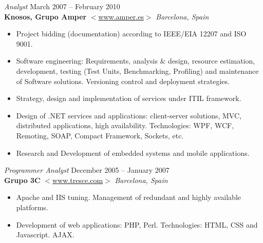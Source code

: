 \documentclass[line,margin]{res}
\begin{document}
\begin{resume}
                {\sl Analyst} \hfill            March 2007 -- February 2010 \\
                \textbf{Knosos, Grupo Amper} 
                $<$\url{www.amper.es}$>$ \hfill \textit{Barcelona, Spain}
                \begin{itemize}  \itemsep 2pt %
                \item Project bidding (documentation) according to IEEE/EIA 12207
                and ISO 9001.               
                \item Software engineering: Requirements, analysis \& design, 
                resource estimation, development, testing (Test Units, Benchmarking,
                Profiling) and maintenance of Software solutions. Versioning control
                and deployment strategies.               
                \item Strategy, design and implementation of services under ITIL 
                framework.               
                \item Design of .NET services and applications: client-server
                solutions, MVC, distributed applications, high availability.
                Technologies: WPF, WCF, Remoting, SOAP, Compact Framework,
                Sockets, etc.
                \item Research and Development of embedded systems and mobile
                applications.
                \\
                \end{itemize}


                {\sl Programmer Analyst} \hfill December 2005 -- January 2007 \\
                \textbf{Grupo 3C} 
                $<$\url{www.tresce.com}$>$ \hfill \textit{Barcelona, 
                Spain}
                \begin{itemize}  \itemsep 2pt %
                \item Apache and IIS tuning. Management of redundant and highly
                available platforms.
                \item Development of web applications: PHP, Perl. Technologies: HTML,
                CSS and Javascript. AJAX.
                \\
                \end{itemize} 


\end{resume}
\end{document}
